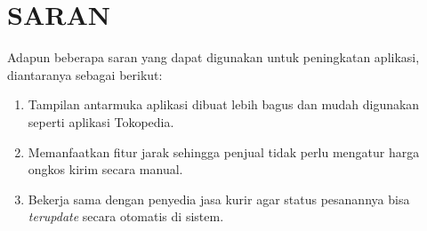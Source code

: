 \section{\uppercase{SARAN}}
Adapun beberapa saran yang dapat digunakan untuk peningkatan aplikasi, diantaranya sebagai berikut:
\begin{enumerate}
    \item Tampilan antarmuka aplikasi dibuat lebih bagus dan mudah digunakan seperti aplikasi Tokopedia.
    \item Memanfaatkan fitur jarak sehingga penjual tidak perlu mengatur harga ongkos kirim secara manual.
    \item Bekerja sama dengan penyedia jasa kurir agar status pesanannya bisa \textit{terupdate} secara otomatis di sistem.
\end{enumerate}


\begin{comment}

\end{comment}